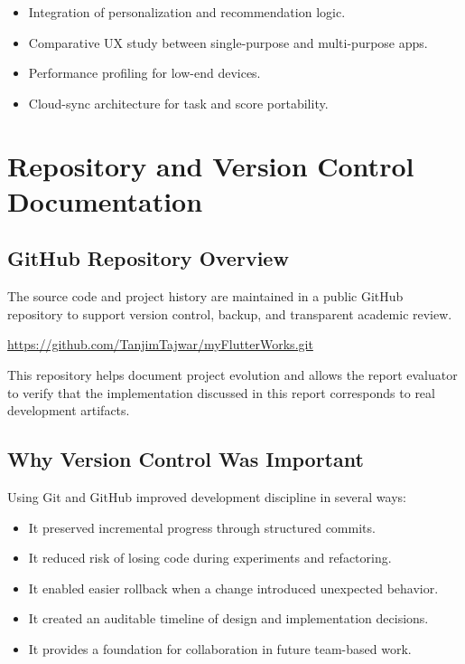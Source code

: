 \documentclass{article}
\begin{document}
\begin{reportbox}
\begin{itemize}
\item Integration of personalization and recommendation logic.
\item Comparative UX study between single-purpose and multi-purpose apps.
\item Performance profiling for low-end devices.
\item Cloud-sync architecture for task and score portability.
\end{itemize}
\end{reportbox}

\newpage
\section{Repository and Version Control Documentation}

\subsection{GitHub Repository Overview}
The source code and project history are maintained in a public GitHub repository to support version control, backup, and transparent academic review.

\begin{reportbox}
\url{https://github.com/TanjimTajwar/myFlutterWorks.git}
\end{reportbox}

This repository helps document project evolution and allows the report evaluator to verify that the implementation discussed in this report corresponds to real development artifacts.

\subsection{Why Version Control Was Important}
Using Git and GitHub improved development discipline in several ways:
\begin{itemize}
\item It preserved incremental progress through structured commits.
\item It reduced risk of losing code during experiments and refactoring.
\item It enabled easier rollback when a change introduced unexpected behavior.
\item It created an auditable timeline of design and implementation decisions.
\item It provides a foundation for collaboration in future team-based work.
\end{itemize}
\end{document}
